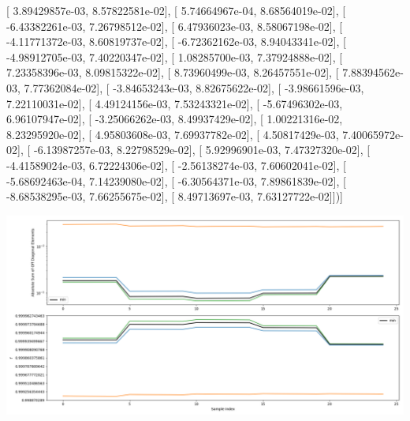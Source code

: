 \documentclass{article}
\begin{document}
       [  3.89429857e-03,   8.57822581e-02],
       [  5.74664967e-04,   8.68564019e-02],
       [ -6.43382261e-03,   7.26798512e-02],
       [  6.47936023e-03,   8.58067198e-02],
       [ -4.11771372e-03,   8.60819737e-02],
       [ -6.72362162e-03,   8.94043341e-02],
       [ -4.98912705e-03,   7.40220347e-02],
       [  1.08285700e-03,   7.37924888e-02],
       [  7.23358396e-03,   8.09815322e-02],
       [  8.73960499e-03,   8.26457551e-02],
       [  7.88394562e-03,   7.77362084e-02],
       [ -3.84653243e-03,   8.82675622e-02],
       [ -3.98661596e-03,   7.22110031e-02],
       [  4.49124156e-03,   7.53243321e-02],
       [ -5.67496302e-03,   6.96107947e-02],
       [ -3.25066262e-03,   8.49937429e-02],
       [  1.00221316e-02,   8.23295920e-02],
       [  4.95803608e-03,   7.69937782e-02],
       [  4.50817429e-03,   7.40065972e-02],
       [ -6.13987257e-03,   8.22798529e-02],
       [  5.92996901e-03,   7.47327320e-02],
       [ -4.41589024e-03,   6.72224306e-02],
       [ -2.56138274e-03,   7.60602041e-02],
       [ -5.68692463e-04,   7.14239080e-02],
       [ -6.30564371e-03,   7.89861839e-02],
       [ -8.68538295e-03,   7.66255675e-02],
       [  8.49713697e-03,   7.63127722e-02]])]
\begin{center}
\includegraphics[scale=.9]{report_pickled_controls203/control_dpn_all.png}

\end{center}
\end{document}
